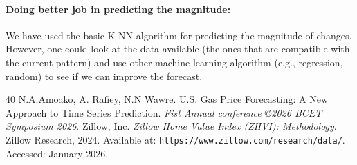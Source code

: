 \documentclass{article}
\begin{document}
\paragraph{Doing better job in predicting the magnitude:} We have used the basic K-NN algorithm for predicting the magnitude of changes. However, one could look at the data available (the ones that are compatible with the current pattern) and use other machine learning algorithm (e.g., regression, random) to see if we can improve the forecast.  

\begin{thebibliography}{40}
 N.A.Amoako, A. Rafiey, N.N Wawre. U.S. Gas Price Forecasting: A New Approach to Time Series Prediction. {\em Fist Annual conference ©2026 BCET Symposium 2026}.
Zillow, Inc. \textit{Zillow Home Value Index (ZHVI): Methodology}.
Zillow Research, 2024. Available at: \texttt{https://www.zillow.com/research/data/}.
Accessed: January 2026.

\end{thebibliography}
\end{document}
